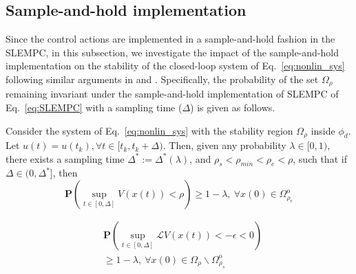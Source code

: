 \documentclass[letterpaper, 10pt, conference]{ieeeconf}
\begin{document}
\subsection{Sample-and-hold implementation}

Since the control actions are implemented in a sample-and-hold fashion in the SLEMPC, in this subsection, we investigate the impact of the sample-and-hold implementation on the stability of the closed-loop system of Eq.~\ref{eq:nonlin_sys} following similar arguments in \cite{mahmood2012lyapunov} and \cite{homer2017output}. Specifically, the probability of the set $\Omega_{\rho}$ remaining invariant under the sample-and-hold implementation of SLEMPC of Eq.~\ref{eq:SLEMPC} with a sampling time ($\Delta$) is given as follows.
\begin{thm}\label{thm3}
	Consider the system of Eq.~\ref{eq:nonlin_sys} with the stability region $\Omega_{\rho}$ inside $\phi_d$. Let $u(t)=u(t_k), \forall t \in [t_{k}, t_k+\Delta)$. Then, given any probability $\lambda \in [0,1)$, there exists a sampling time $\Delta^* := \Delta^*(\lambda)$, and $\rho_s < \rho_{min} <\rho_{e} <\rho$, such that if $\Delta \in (0,\Delta^*]$, then 	
	\begin{equation}
	\label{eq:sample_p1}
	\mathbf{P}(\sup \limits_{t \in[0,\Delta]}V(x(t)) < \rho ) \geq 1-
	\lambda,~\forall x(0) \in \Omega_{\rho_e}^{\text{o}}
	\end{equation}
	
	\begin{equation}
	\label{eq:sample_p2}
	\begin{split}
	&\mathbf{P}(\sup \limits_{t \in [0, \Delta]}
	\mathcal{L}V(x(t))<- \epsilon < 0)\\
	&\geq 1- \lambda,~\forall x(0) \in \Omega_\rho \backslash \Omega_{\rho_s}^{\text{o}}
	\end{split}
	\end{equation}
\end{thm}

\hspace{0.4cm}\\
\end{document}

